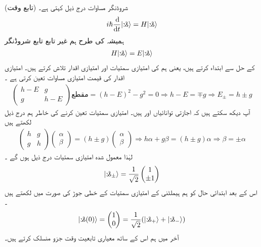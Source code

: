  \quad 
 (تابع وقت) شروڈنگر مساوات درج ذیل کہتی ہے۔ 
\begin{align}
i \hslash \frac{\dif}{\dif t} | \s \rangle = H | \s \rangle
\end{align}
ہمیشہ کی طرح ہم غیر تابع تابع شروڈنگر
\begin{align}
H | \s \rangle = E | \s \rangle 
\end{align}
 کے حل سے ابتداء کرتے ہیں، یعنی ہم  کی امتیازی سمتیات اور امتیازی اقدار تلاش کرتے ہیں۔ امتیازی اقدار کی قیمت امتیازی مساوات تعین کرتی ہے ۔
\begin{align*}
 \begin{pmatrix} h-E & g \\ g & h-E \end{pmatrix}\text{مقطع} = (h-E)^{2} - g^{2} = 0 \Rightarrow h-E = \mp g \Rightarrow E_{\pm} = h \pm g
\end{align*}
آپ دیکھ سکتے ہیں کہ اجازتی توانائیاں  اور  ہیں۔ امتیازی سمتیات تعین کرنے کی خاطر ہم درج ذیل لکھتے ہیں 
\begin{align*}
\begin{pmatrix} h & g \\ g & h \end{pmatrix} \begin{pmatrix}
 \alpha \\ \beta \end{pmatrix} = (h\pm g) \begin{pmatrix} \alpha \\ \beta \end{pmatrix} \Rightarrow h\alpha + g\beta = (h\pm g) \alpha \Rightarrow \beta = \pm \alpha
\end{align*}
لہٰذا معمول شدہ امتیازی سمتیات درج ذیل ہوں گے ۔
\begin{align*}
| \s _{\pm} \rangle = \frac{1}{\sqrt{2}} \begin{pmatrix} 1 \\ \pm 1 \end{pmatrix}
\end{align*}
اس کے بعد ابتدائی حال کو ہم ہیملٹنی کے امتیازی سمتیات کے خطی جوڑ کی صورت میں لکھتے ہیں ۔
\begin{align*}
| \s (0) \rangle = \begin{pmatrix} 1 \\ 0 \end{pmatrix} = \frac{1}{\sqrt{2}} ( | \s_{+} \rangle + | \s_{-} \rangle )
\end{align*}
آخر میں ہم اس کے ساتھ معیاری تابعیت وقت جزو  منسلک کرتے ہیں۔ 
